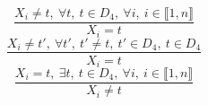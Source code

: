 $$\frac{X_{i} \neq t,~\forall t,~t \in D_{4},~\forall i,~i \in \llbracket1,n\rrbracket}{X_{i}=t}$$ $$\frac{X_{i} \neq t',~\forall t',~t' \neq t,~t' \in D_{4},~t \in D_{4}}{X_{i}=t}$$ $$\frac{X_{i}=t,~\exists t,~t \in D_{4},~\forall i,~i \in \llbracket1,n\rrbracket}{X_{i} \neq t}$$ 